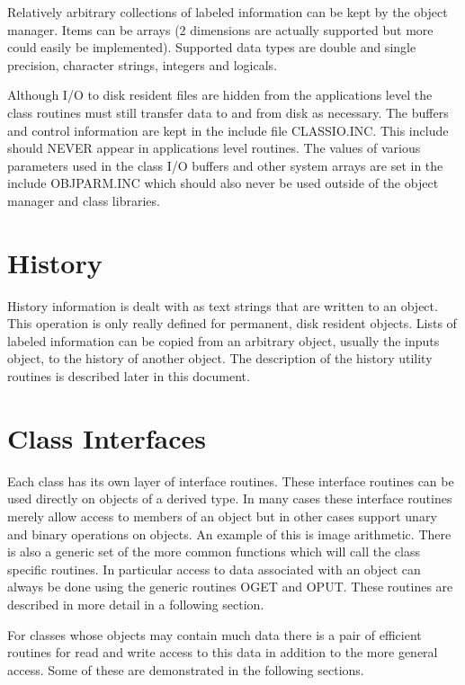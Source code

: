    Relatively arbitrary collections of labeled information can be kept
by the object manager.  Items can be arrays (2 dimensions are actually
supported but more could easily be implemented).  Supported data types
are double and single precision, character strings, integers and
logicals.

   Although I/O to disk resident files are hidden from the
applications level the class routines must still transfer data to and
from disk as necessary.  The buffers and control information are kept
in the include file CLASSIO.INC.  This include should NEVER appear in
applications level routines.  The values of various parameters used in
the class I/O buffers and other system arrays are set in the include
OBJPARM.INC which should also never be used outside of the object
manager and class libraries.

\section{History}

   History information is dealt with as text strings that are written
to an object.  This operation is only really defined for permanent,
disk resident objects.  Lists of labeled information can be copied
from an arbitrary object, usually the inputs object, to the history of
another object.  The description of the history utility routines is
described later in this document.


\section{Class Interfaces}

   Each class has its own layer of interface routines.  These
interface routines can be used directly on objects of a derived type.
In many cases these interface routines merely allow access to members
of an object but in other cases support unary and binary operations on
objects.  An example of this is image arithmetic.
There is also a generic set of the more common functions which will
call the class specific routines.  In particular access to data
associated with an object can always be done using the generic
routines OGET and OPUT.  These routines are described in more detail
in a following section.

   For classes whose objects may contain much data there is a pair of
efficient routines for read and write access to this data in addition
to the more general access.  Some of these are demonstrated in the
following sections.


